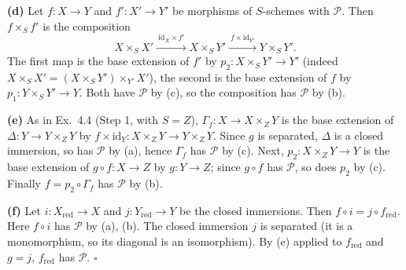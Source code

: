 \documentclass[11pt]{article}
\begin{document}
\pf
\textbf{(d)} Let $f:X\to Y$ and $f':X'\to Y'$ be morphisms of $S$-schemes with $\mathcal P$. Then $f\times_Sf'$ is the composition
\[
X\times_SX'\xrightarrow{\ \mathrm{id}_X\times f'\ }X\times_SY'\xrightarrow{\ f\times\mathrm{id}_{Y'}\ }Y\times_SY'.
\]
The first map is the base extension of $f'$ by $p_2:X\times_SY'\to Y'$ (indeed $X\times_SX'=(X\times_SY')\times_{Y'}X'$), the second is the base extension of $f$ by $p_1:Y\times_SY'\to Y$. Both have $\mathcal P$ by (c), so the composition has $\mathcal P$ by (b).

\textbf{(e)} As in Ex.~4.4 (Step 1, with $S=Z$), $\Gamma_f:X\to X\times_ZY$ is the base extension of $\Delta:Y\to Y\times_ZY$ by $f\times\mathrm{id}_Y:X\times_ZY\to Y\times_ZY$. Since $g$ is separated, $\Delta$ is a closed immersion, so has $\mathcal P$ by (a), hence $\Gamma_f$ has $\mathcal P$ by (c). Next, $p_2:X\times_ZY\to Y$ is the base extension of $g\circ f:X\to Z$ by $g:Y\to Z$; since $g\circ f$ has $\mathcal P$, so does $p_2$ by (c). Finally $f=p_2\circ\Gamma_f$ has $\mathcal P$ by (b).

\textbf{(f)} Let $i:X_{\mathrm{red}}\to X$ and $j:Y_{\mathrm{red}}\to Y$ be the closed immersions. Then $f\circ i=j\circ f_{\mathrm{red}}$. Here $f\circ i$ has $\mathcal P$ by (a), (b). The closed immersion $j$ is separated (it is a monomorphism, so its diagonal is an isomorphism). By (e) applied to $f_{\mathrm{red}}$ and $g=j$, $f_{\mathrm{red}}$ has $\mathcal P$. \hfill$\square$
\end{document}
